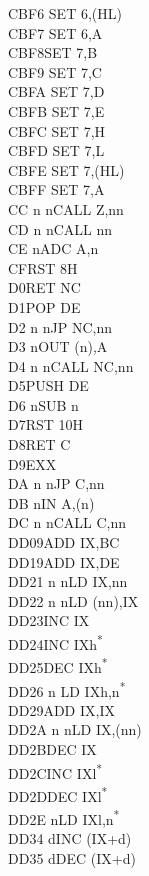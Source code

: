 \documentclass[twoside,openright,a4paper]{book}
\begin{document}
\begin{multicols}{3}
{\begin{tabbing}
	CBF6\> 	SET 6,(HL)\\
	CBF7\> 	SET 6,A\\
	CBF8\>SET 7,B\\
	CBF9\> 	SET 7,C\\
	CBFA\> 	SET 7,D\\
	CBFB\> 	SET 7,E\\
	CBFC\> 	SET 7,H\\
	CBFD\> 	SET 7,L\\
	CBFE\> 	SET 7,(HL)\\
	CBFF\> 	SET 7,A\\
	CC n n\>CALL Z,nn\\
	CD n n\>CALL nn\\
	CE n\>ADC A,n\\
	CF\>RST 8H\\
	D0\>RET NC\\
	D1\>POP DE\\
	D2 n n\>JP NC,nn\\
	D3 n\>OUT (n),A\\
	D4 n n\>CALL NC,nn\\
	D5\>PUSH DE\\
	D6 n\>SUB n\\
	D7\>RST 10H\\
	D8\>RET C\\
	D9\>EXX\\
	DA n n\>JP C,nn\\
	DB n\>IN A,(n)\\
	DC n n\>CALL C,nn\\
	DD09\>ADD IX,BC\\
	DD19\>ADD IX,DE\\
	DD21 n n\>LD IX,nn\\
	DD22 n n\>LD (nn),IX\\
	DD23\>INC IX\\
	DD24\>INC IXh\textsuperscript{*}\\
	DD25\>DEC IXh\textsuperscript{*}\\
	DD26 n \>LD IXh,n\textsuperscript{*}\\
	DD29\>ADD IX,IX\\
	DD2A n n\>LD IX,(nn)\\
	DD2B\>DEC IX\\
	DD2C\>INC IXl\textsuperscript{*}\\
	DD2D\>DEC IXl\textsuperscript{*}\\
	DD2E n\>LD IXl,n\textsuperscript{*}\\
	DD34 d\>INC (IX+d)\\
	DD35 d\>DEC (IX+d)\\

\end{tabbing}}
\end{multicols}
\end{document}
